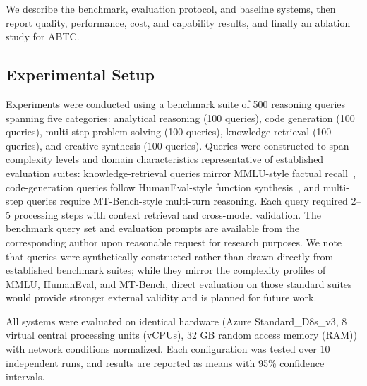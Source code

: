 \documentclass{iopjournal}
\begin{document}
We describe the benchmark, evaluation protocol, and baseline systems, then report quality, performance, cost, and capability results, and finally an ablation study for ABTC.

\subsection{Experimental Setup}

Experiments were conducted using a benchmark suite of 500 reasoning
queries spanning five categories: analytical reasoning (100 queries),
code generation (100 queries), multi-step problem solving (100 queries),
knowledge retrieval (100 queries), and creative synthesis (100 queries).
Queries were constructed to span complexity levels and domain characteristics
representative of established evaluation suites: knowledge-retrieval queries
mirror MMLU-style factual recall~\cite{HolisticEval}, code-generation queries
follow HumanEval-style function synthesis~\cite{chen2024evolution}, and multi-step queries
require MT-Bench-style multi-turn reasoning.
Each query required 2--5 processing steps with context retrieval and
cross-model validation. The benchmark query set and evaluation prompts are available from the corresponding author upon reasonable request for research purposes. We note that queries were synthetically constructed rather than drawn directly from established benchmark suites; while they mirror the complexity profiles of MMLU, HumanEval, and MT-Bench, direct evaluation on those standard suites would provide stronger external validity and is planned for future work.

All systems were evaluated on identical hardware (Azure Standard\_D8s\_v3,
8 virtual central processing units (vCPUs), 32 GB random access memory (RAM)) with network conditions normalized. Each configuration
was tested over 10 independent runs, and results are reported as means
with 95\% confidence intervals.
\end{document}
